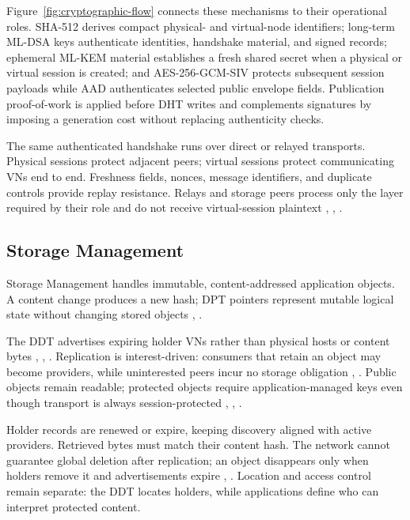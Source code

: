 \documentclass[
  12pt,
  oneside,
  a4paper,
  chapter=TITLE,
  section=TITLE,
  english,
  brazil
]{abntex2}
\begin{document}
Figure~\ref{fig:cryptographic-flow} connects these mechanisms to their operational roles. SHA-512 derives compact physical- and virtual-node identifiers; long-term ML-DSA keys authenticate identities, handshake material, and signed records; ephemeral ML-KEM material establishes a fresh shared secret when a physical or virtual session is created; and AES-256-GCM-SIV protects subsequent session payloads while AAD authenticates selected public envelope fields. Publication proof-of-work is applied before DHT writes and complements signatures by imposing a generation cost without replacing authenticity checks.

\thesiscryptographicflowtikz

The same authenticated handshake runs over direct or relayed transports. Physical sessions protect adjacent peers; virtual sessions protect communicating VNs end to end. Freshness fields, nonces, message identifiers, and duplicate controls provide replay resistance. Relays and storage peers process only the layer required by their role and do not receive virtual-session plaintext \cite{li2022unreachable}, \cite{mirzaei2018pk}, \cite{qian2016garlic}.

\subsection{Storage Management}

Storage Management handles immutable, content-addressed application objects. A content change produces a new hash; DPT pointers represent mutable logical state without changing stored objects \cite{augustine2022byzantine}, \cite{qian2016garlic}.


\thesisddttikz


The DDT advertises expiring holder VNs rather than physical hosts or content bytes \cite{augustine2022byzantine}, \cite{mirzaei2018pk}, \cite{qian2016garlic}. Replication is interest-driven: consumers that retain an object may become providers, while uninterested peers incur no storage obligation \cite{mehr2019unstructured}, \cite{augustine2022byzantine}. Public objects remain readable; protected objects require application-managed keys even though transport is always session-protected \cite{qian2016garlic}, \cite{bos2017kyber}, \cite{nist2024fips203}.

\thesisephemeraltikz

Holder records are renewed or expire, keeping discovery aligned with active providers. Retrieved bytes must match their content hash. The network cannot guarantee global deletion after replication; an object disappears only when holders remove it and advertisements expire \cite{augustine2022byzantine}, \cite{qian2016garlic}. Location and access control remain separate: the DDT locates holders, while applications define who can interpret protected content.
\end{document}
